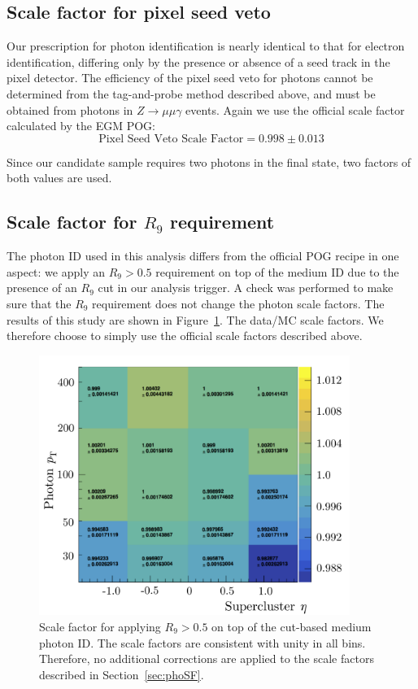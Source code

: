 \subsection{Scale factor for pixel seed veto}
\label{sec:PSV_SF}
Our prescription for photon identification is nearly identical to that for
electron identification, differing only by the presence or absence of a seed
track in the pixel detector. The efficiency of the pixel seed veto
for photons cannot be determined from the tag-and-probe method described above,
and must be obtained from photons in $Z\rightarrow \mu\mu\gamma$
events. Again we use the official scale factor calculated by the
EGM POG:
\begin{equation}
  \textrm{Pixel Seed Veto Scale Factor} = 0.998\pm0.013
\end{equation}

Since our candidate sample requires two photons in the final state,
two factors of both values are used.


\subsection{Scale factor for $R_9$ requirement}
\label{sec:R9SF}
The photon ID used in this analysis differs from the official POG recipe in one aspect: we apply an $R_9 > 0.5$ requirement on top of the medium ID due to the presence of an $R_9$ cut in our analysis trigger. A check was performed to make sure that the $R_9$ requirement does not change the photon scale factors. The results of this study are shown in Figure~\ref{fig:R9SF}. The data/MC scale factors. We therefore choose to simply use the official scale factors described above. 

\begin{figure}[htbp]
    \centering
    \includegraphics[width=0.9\textwidth]{Figures/EventSelect/R9SF.pdf}
    \caption{Scale factor for applying $R_9 > 0.5$ on top of the cut-based medium photon ID.
    The scale factors are consistent with unity in all bins. Therefore, no additional corrections are applied to
    the scale factors described in Section~\ref{sec:phoSF}.}
    \label{fig:R9SF}
\end{figure}


